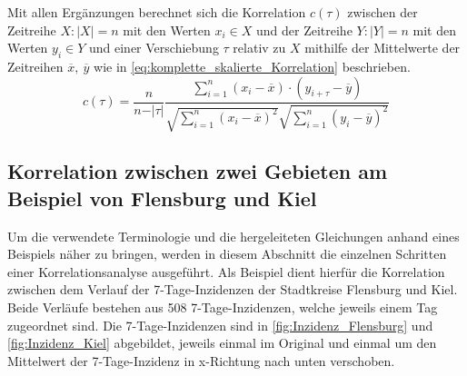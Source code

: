 Mit allen Ergänzungen berechnet sich die Korrelation $c(\tau)$ zwischen der Zeitreihe $X:|X|=n$ mit den Werten $x_i\in X$ und der Zeitreihe $Y:|Y|=n$ mit den Werten $y_i \in Y$ und einer Verschiebung $\tau$ relativ zu $X$ mithilfe der Mittelwerte der Zeitreihen $\overline x,\ \overline y$ wie in \autoref{eq:komplette_skalierte_Korrelation} beschrieben.
\begin{equation}\label{eq:komplette_skalierte_Korrelation}
    c(\tau) =\frac{n}{n-\vert\tau\vert}
    \frac{\sum_{i=1}^n (x_i-\overline x)\cdot (y_{i+\tau}-\overline y)}{\sqrt{\sum_{i=1}^n (x_i-\overline x)^2}\sqrt{\sum_{i=1}^n (y_i-\overline y)^2}}
\end{equation}

\subsection{Korrelation zwischen zwei Gebieten am Beispiel von Flensburg und Kiel}
Um die verwendete Terminologie und die hergeleiteten Gleichungen anhand eines Beispiels näher zu bringen, werden in diesem Abschnitt die einzelnen Schritten einer Korrelationsanalyse ausgeführt. Als Beispiel dient hierfür die Korrelation zwischen dem Verlauf der 7-Tage-Inzidenzen der Stadtkreise Flensburg und Kiel. Beide Verläufe bestehen aus 508 7-Tage-Inzidenzen, welche jeweils einem Tag zugeordnet sind. Die 7-Tage-Inzidenzen sind in \autoref{fig:Inzidenz_Flensburg} und \autoref{fig:Inzidenz_Kiel} abgebildet, jeweils einmal im Original und einmal um den Mittelwert der 7-Tage-Inzidenz in x-Richtung nach unten verschoben.

